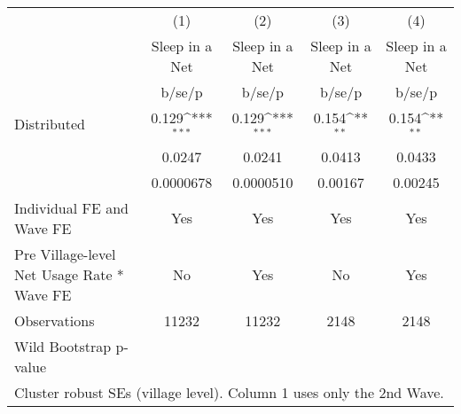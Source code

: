 {
\def\sym#1{\ifmmode^{#1}\else\(^{#1}\)\fi}
\begin{tabular}{l*{4}{c}}
\hline\hline
                    &\multicolumn{1}{c}{(1)}&\multicolumn{1}{c}{(2)}&\multicolumn{1}{c}{(3)}&\multicolumn{1}{c}{(4)}\\
                    &\multicolumn{1}{c}{Sleep in a Net}&\multicolumn{1}{c}{Sleep in a Net}&\multicolumn{1}{c}{Sleep in a Net}&\multicolumn{1}{c}{Sleep in a Net}\\
                    &      b/se/p         &      b/se/p         &      b/se/p         &      b/se/p         \\
\hline
Distributed         &       0.129\sym{***}&       0.129\sym{***}&       0.154\sym{**} &       0.154\sym{**} \\
                    &      0.0247         &      0.0241         &      0.0413         &      0.0433         \\
                    &   0.0000678         &   0.0000510         &     0.00167         &     0.00245         \\
Individual FE and Wave FE &         Yes         &         Yes         &         Yes         &         Yes         \\
Pre Village-level Net Usage Rate * Wave FE&          No         &         Yes         &          No         &         Yes         \\
\hline
Observations        &       11232         &       11232         &        2148         &        2148         \\
Wild Bootstrap p-value &                     &                     &                     &                     \\
\hline\hline
\multicolumn{5}{l}{\footnotesize Cluster robust SEs (village level). Column 1 uses only the 2nd Wave.}\\
\end{tabular}
}

